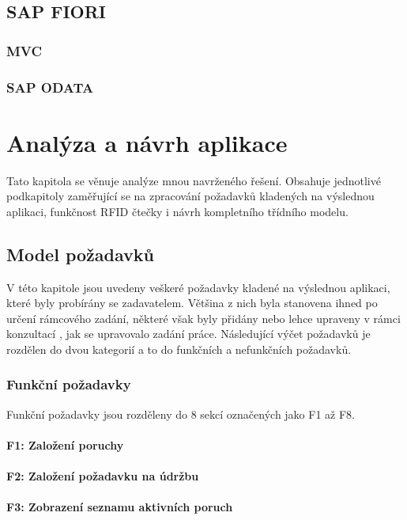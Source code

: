 \documentclass[thesis=M,czech]{FITthesis}[2012/06/26]
\begin{document}
\section{SAP FIORI}

\subsection{MVC}

\subsection{SAP ODATA}





\chapter{Analýza a návrh aplikace}
Tato kapitola se věnuje analýze mnou navrženého řešení. Obsahuje jednotlivé podkapitoly zaměřující se na zpracování požadavků kladených na výslednou aplikaci, funkčnost RFID čtečky i návrh kompletního třídního modelu.	

\section{Model požadavků}
V této kapitole jsou uvedeny veškeré požadavky kladené na  výslednou aplikaci, které byly probírány se zadavatelem. Většina z nich byla stanovena ihned po určení rámcového zadání, některé však byly přidány nebo lehce upraveny v rámci konzultací , jak se upravovalo zadání práce. Následující výčet požadavků je rozdělen do dvou kategorií a to do funkčních a nefunkčních požadavků.  

\subsection{Funkční požadavky}
Funkční požadavky jsou rozděleny do 8 sekcí označených jako F1 až F8. 

\subsubsection{F1: Založení poruchy}
\subsubsection{F2: Založení požadavku na údržbu}
\subsubsection{F3: Zobrazení seznamu aktivních poruch}
\end{document}

